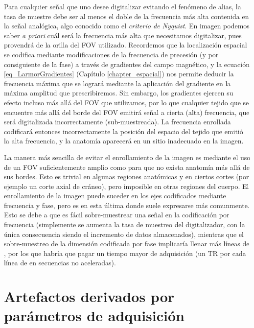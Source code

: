 Para cualquier señal que uno desee digitalizar evitando el fenómeno de alias, la tasa de muestre debe ser al menos el doble de la frecuencia más alta contenida en la señal analógica, algo conocido como el \textit{criterio de Nyquist}. En imagen podemos saber \textit{a priori} cuál será la frecuencia más alta que necesitamos digitalizar, pues provendrá de la orilla del FOV utilizado. Recordemos que la localización espacial se codifica mediante modificaciones de la frecuencia de precesión (y por consiguiente de la fase) a través de gradientes del campo magnético, y la ecuación \ref{eq_LarmorGradientes} (Capítulo \ref{chapter_espacial}) nos permite deducir la frecuencia máxima que se logrará mediante la aplicación del gradiente en la máxima amplitud que prescribiremos. Sin embargo, los gradientes ejercen su efecto incluso más allá del FOV que utilizamos, por lo que cualquier tejido que se encuentre más allá del borde del FOV emitirá señal a cierta (alta) frecuencia, que será digitalizada incorrectamente (sub-muestreada). La frecuencia enrollada codificará entonces incorrectamente la posición del espacio del tejido que emitió la alta frecuencia, y la anatomía aparecerá en un sitio inadecuado en la imagen.

La manera más sencilla de evitar el enrollamiento de la imagen es mediante el uso de un FOV suficientemente amplio como para que no exista anatomía más allá de sus bordes. Esto es trivial en algunas regiones anatómicas y en ciertos cortes (por ejemplo un corte axial de cráneo), pero imposible en otras regiones del cuerpo. El enrollamiento de la imagen puede suceder en los ejes codificados mediante frecuencia y fase, pero es en esta última donde suele expresarse más comunmente. Esto se debe a que es fácil sobre-muestrear una señal en la codificación por frecuencia (simplemente se aumenta la tasa de muestreo del digitalizador, con la única consecuencia siendo el incremento de datos almacenados), mientras que el sobre-muestreo de la dimensión codificada por fase implicaría llenar más líneas de \espaciok, por los que habría que pagar un tiempo mayor de adquisición (un TR por cada línea de \espaciok en secuencias no aceleradas). 


\section{Artefactos derivados por parámetros de adquisición}
